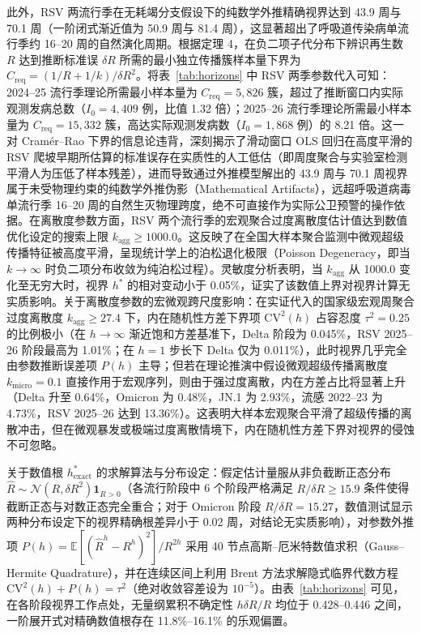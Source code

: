 \documentclass[11pt,a4paper]{article}
\theoremstyle{plain}
\theoremstyle{definition}
\begin{document}
此外，RSV 两流行季在无耗竭分支假设下的纯数学外推精确视界达到 43.9 周与 70.1 周（一阶闭式渐近值为 50.9 周与 81.4 周），这显著超出了呼吸道传染病单流行季约 16--20 周的自然演化周期。根据定理 4，在负二项子代分布下辨识再生数 $R$ 达到推断标准误 $\delta R$ 所需的最小独立传播簇样本量下界为 $C_{\text{req}} = (1/R + 1/k)/\delta R^2$。将表~\ref{tab:horizons} 中 RSV 两季参数代入可知：2024--25 流行季理论所需最小样本量为 $C_{\text{req}} = 5,826$ 簇，超过了推断窗口内实际观测发病总数（$I_0 = 4,409$ 例，比值 1.32 倍）；2025--26 流行季理论所需最小样本量为 $C_{\text{req}} = 15,332$ 簇，高达实际观测发病数（$I_0 = 1,868$ 例）的 8.21 倍。这一对 Cram\'er--Rao 下界的信息论违背，深刻揭示了滑动窗口 OLS 回归在高度平滑的 RSV 爬坡早期所估算的标准误存在实质性的人工低估（即周度聚合与实验室检测平滑人为压低了样本残差），进而导致通过外推模型解出的 43.9 周与 70.1 周视界属于未受物理约束的纯数学外推伪影（Mathematical Artifacts），远超呼吸道病毒单流行季 16--20 周的自然生灭物理跨度，绝不可直接作为实际公卫预警的操作依据。在离散度参数方面，RSV 两个流行季的宏观聚合过度离散度估计值达到数值优化设定的搜索上限 $k_{\text{agg}} \ge 1000.0$。这反映了在全国大样本聚合监测中微观超级传播特征被高度平滑，呈现统计学上的泊松退化极限（Poisson Degeneracy，即当 $k \to \infty$ 时负二项分布收敛为纯泊松过程）。灵敏度分析表明，当 $k_{\text{agg}}$ 从 1000.0 变化至无穷大时，视界 $h^*$ 的相对变动小于 0.05\%，证实了该数值上界对视界计算无实质影响。关于离散度参数的宏微观跨尺度影响：在实证代入的国家级宏观周聚合过度离散度 $k_{\text{agg}} \ge 27.4$ 下，内在随机性方差下界项 $\text{CV}^2(h)$ 占容忍度 $\tau^2 = 0.25$ 的比例极小（在 $h \to \infty$ 渐近饱和方差基准下，Delta 阶段为 0.045\%，RSV 2025--26 阶段最高为 1.01\%；在 $h=1$ 步长下 Delta 仅为 0.011\%），此时视界几乎完全由参数推断误差项 $P(h)$ 主导；但若在理论推演中假设微观超级传播离散度 $k_{\text{micro}} = 0.1$ 直接作用于宏观序列，则由于强过度离散，内在方差占比将显著上升（Delta 升至 0.64\%，Omicron 为 0.48\%，JN.1 为 2.93\%，流感 2022--23 为 4.73\%，RSV 2025--26 达到 13.36\%）。这表明大样本宏观聚合平滑了超级传播的离散冲击，但在微观暴发或极端过度离散情境下，内在随机性方差下界对视界的侵蚀不可忽略。

关于数值根 $h^*_{\text{exact}}$ 的求解算法与分布设定：假定估计量服从非负截断正态分布 $\hat{R} \sim \mathcal{N}(R, \delta R^2)\mathbf{1}_{\hat{R}>0}$（各流行阶段中 6 个阶段严格满足 $R/\delta R \ge 15.9$ 条件使得截断正态与对数正态完全重合；对于 Omicron 阶段 $R/\delta R = 15.27$，数值测试显示两种分布设定下的视界精确根差异小于 0.02 周，对结论无实质影响），对参数外推项 $P(h) = \mathbb{E}[(\hat{R}^h - R^h)^2]/R^{2h}$ 采用 40 节点高斯--厄米特数值求积（Gauss--Hermite Quadrature），并在连续区间上利用 Brent 方法求解隐式临界代数方程 $\text{CV}^2(h) + P(h) = \tau^2$（绝对收敛容差设为 $10^{-5}$）。由表~\ref{tab:horizons} 可见，在各阶段视界工作点处，无量纲累积不确定性 $h \delta R / R$ 均位于 0.428--0.446 之间，一阶展开式对精确数值根存在 11.8\%--16.1\% 的乐观偏置。
\end{document}
